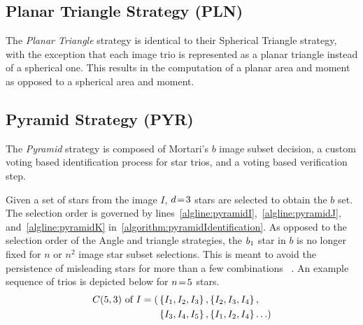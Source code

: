 
\subsection{Planar Triangle Strategy (PLN)}\label{subsec:coleAndCrassidus'sPlanarTriangleMethod}
The \textit{Planar Triangle} strategy is identical to their Spherical Triangle strategy, with the exception that each
image trio is represented as a planar triangle instead of a spherical one.
This results in the computation of a planar area and moment as opposed to a spherical area and moment.

\subsection{Pyramid Strategy (PYR)}\label{subsec:pyramidMethod}
The \textit{Pyramid} strategy is composed of Mortari's $b$ image subset decision, a custom voting based identification
process for star trios, and a voting based verification step.

Given a set of stars from the image $I$, $d \!=\! 3$ stars are selected to obtain the $b$ set.
The selection order is governed by lines~\ref{algline:pyramidI},~\ref{algline:pyramidJ}, and~\ref{algline:pyramidK}
in~\autoref{algorithm:pyramidIdentification}.
As opposed to the selection order of the Angle and triangle strategies, the $b_1$ star in $b$ is no longer fixed
for $n$ or $n^2$ image star subset selections.
This is meant to avoid the persistence of misleading stars for more than a few combinations
~\cite{mortari:pyramidIdentification}.
An example sequence of trios is depicted below for $n \!=\! 5$ stars.
\begin{equation}
    \begin{aligned}
        C(5, 3) \text{ of } I = ( &\left\{ I_1, I_2, I_3 \right\}, \left\{ I_2, I_3, I_4 \right\}, \\
        &\left\{ I_3, I_4, I_5 \right\}, \left\{ I_1, I_2, I_4  \right\}\ldots )
    \end{aligned}
\end{equation}


